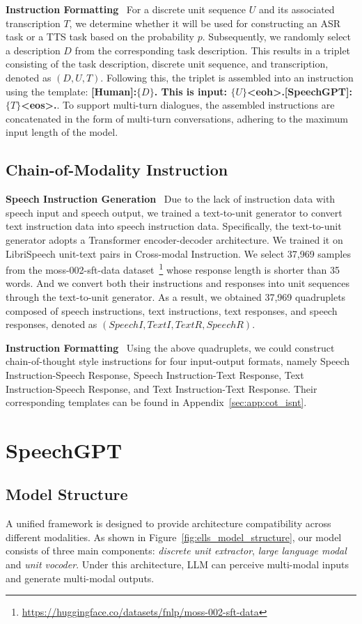 \noindent\textbf{Instruction Formatting}~
For a discrete unit sequence $U$ and its associated transcription $T$, we determine whether it will be used for constructing an ASR task or a TTS task based on the probability $p$. Subsequently, we randomly select a description $D$ from the corresponding task description. This results in a triplet consisting of the task description, discrete unit sequence, and transcription, denoted as $(D,U,T)$. Following this, the triplet is assembled into an instruction using the template: \textbf{[Human]:$\{D\}$. This is input: $\{U\}$<eoh>.[SpeechGPT]: $\{T\}$<eos>.}.
To support multi-turn dialogues, the assembled instructions are concatenated in the form of multi-turn conversations, adhering to the maximum input length of the model.

\subsection{Chain-of-Modality Instruction }
\label{sec:132_cot_data}
\noindent\textbf{Speech Instruction Generation}~
Due to the lack of instruction data with speech input and speech output, we trained a text-to-unit generator to convert text instruction data into speech instruction data. Specifically, the text-to-unit generator adopts a Transformer encoder-decoder architecture. We trained it on LibriSpeech unit-text pairs in Cross-modal Instruction. 
We select 37,969 samples from the moss-002-sft-data dataset~\footnote{\url{https://huggingface.co/datasets/fnlp/moss-002-sft-data}} whose response length is shorter than 35 words. And we convert both their instructions and responses into unit sequences through the text-to-unit generator. As a result, we obtained 37,969 quadruplets composed of speech instructions, text instructions, text responses, and speech responses, denoted as $(SpeechI, TextI, TextR, SpeechR)$.

\noindent\textbf{Instruction Formatting}~
Using the above quadruplets, we could construct chain-of-thought style instructions for four input-output formats, namely Speech Instruction-Speech Response, Speech Instruction-Text Response, Text Instruction-Speech Response, and Text Instruction-Text Response. Their corresponding templates can be found in Appendix~\ref{sec:app:cot_isnt}.

\section{SpeechGPT}

\subsection{Model Structure}
\label{sec:031_model_structure}
A unified framework is designed to provide architecture compatibility across different modalities.
As shown in Figure~\ref{fig:ells_model_structure}, our model consists of three main components: \textit{discrete unit extractor}, \textit{large language modal} and \textit{unit vocoder}. Under this architecture, LLM can perceive multi-modal inputs and generate multi-modal outputs.

